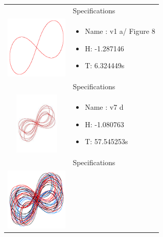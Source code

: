 \begin{table}[H]
	\centering
	\begin{tabular}{ | c | m{5cm}| }
		\hline
		& Specifications\\ 
		\begin{minipage}{.3\textwidth}
			\includegraphics[width=30mm, height=30mm]{chapters/chapter5/v1a}
		\end{minipage}
		&
		\begin{itemize}
			\item Name : v1 a/ Figure 8
			\item H: -1.287146 
			\item T: 6.324449s
		\end{itemize}\\
		\hline
		& Specifications\\ 
		\begin{minipage}{.3\textwidth}
			\includegraphics[width=30mm, height=30mm]{chapters/chapter5/v7d}
		\end{minipage}
		&
		\begin{itemize}
			\item Name : v7 d
			\item H: -1.080763 
			\item T: 57.545253s
		\end{itemize}\\
		\hline
		& Specifications\\ 
		\begin{minipage}{.3\textwidth}
			\includegraphics[width=30mm, height=30mm]{chapters/chapter5/v11a}

\end{minipage}
\end{tabular}
\end{table}
